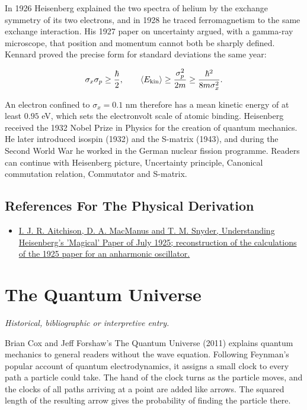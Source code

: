 \documentclass[11pt,oneside]{book}
\newenvironment{centeredalign}{\[\begin{gathered}[c]}{\end{gathered}\]}
\begin{document}
In 1926 Heisenberg explained the two spectra of helium by the exchange symmetry of its two electrons, and in 1928 he traced ferromagnetism to the same exchange interaction. His 1927 paper on uncertainty argued, with a gamma-ray microscope, that position and momentum cannot both be sharply defined. Kennard proved the precise form for standard deviations the same year:

\begin{centeredalign}
\sigma_x\sigma_p\geq\frac{\hbar}{2},\qquad
\langle E_{\rm kin}\rangle\geq\frac{\sigma_p^2}{2m}\geq\frac{\hbar^2}{8m\sigma_x^2} .
\end{centeredalign}

An electron confined to \(\sigma_x=0.1\) nm therefore has a mean kinetic energy of at least \(0.95\) eV, which sets the electronvolt scale of atomic binding. Heisenberg received the 1932 Nobel Prize in Physics for the creation of quantum mechanics. He later introduced isospin (1932) and the S-matrix (1943), and during the Second World War he worked in the German nuclear fission programme. Readers can continue with Heisenberg picture, Uncertainty principle, Canonical commutation relation, Commutator and S-matrix.

\subsection*{References For The Physical Derivation}
\begin{itemize}
\item \href{https://arxiv.org/abs/quant-ph/0404009}{I. J. R. Aitchison, D. A. MacManus and T. M. Snyder, Understanding Heisenberg's 'Magical' Paper of July 1925; reconstruction of the calculations of the 1925 paper for an anharmonic oscillator.}
\end{itemize}





\clearpage

\section{The Quantum Universe}

\label{topic:the-quantum-universe}

\par\smallskip\noindent\textit{Historical, bibliographic or interpretive entry.}

Brian Cox and Jeff Forshaw's The Quantum Universe (2011) explains quantum mechanics to general readers without the wave equation. Following Feynman's popular account of quantum electrodynamics, it assigns a small clock to every path a particle could take. The hand of the clock turns as the particle moves, and the clocks of all paths arriving at a point are added like arrows. The squared length of the resulting arrow gives the probability of finding the particle there.
\end{document}

